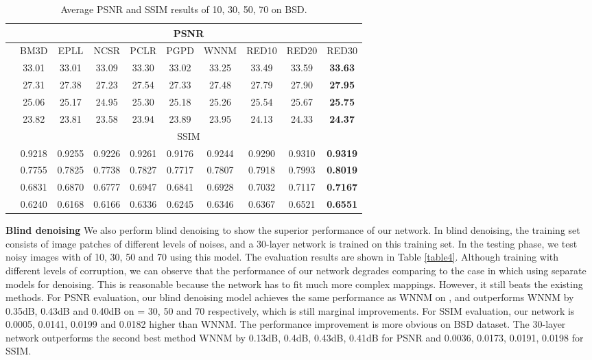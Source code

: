 \documentclass[10pt,journal,compsoc]{IEEEtran}
\begin{document}
\begin{table*}[htb!]
\centering
\caption{Average PSNR and SSIM results of  10, 30, 50, 70 on BSD.}
\begin{tabular}{ c|c c c c c c c c c } \hline
			  &\multicolumn{9}{c}{PSNR}            \\ \hline
              &BM3D   &EPLL   &NCSR   &PCLR   &PGPD   &WNNM   &RED10  &RED20  &RED30 \\ \hline
   &33.01  &33.01  &33.09  &33.30  &33.02  &33.25  &33.49  &33.59  &\textbf{33.63} \\ \hline
   &27.31  &27.38  &27.23  &27.54  &27.33  &27.48  &27.79  &27.90  &\textbf{27.95} \\ \hline
   &25.06  &25.17  &24.95  &25.30  &25.18  &25.26  &25.54  &25.67  &\textbf{25.75} \\ \hline
   &23.82  &23.81  &23.58  &23.94  &23.89  &23.95  &24.13  &24.33  &\textbf{24.37} \\ \hline
              &\multicolumn{9}{c}{SSIM}            \\ \hline
   &0.9218 &0.9255 &0.9226 &0.9261 &0.9176 &0.9244 &0.9290 &0.9310 &\textbf{0.9319} \\ \hline
   &0.7755 &0.7825 &0.7738 &0.7827 &0.7717 &0.7807 &0.7918 &0.7993 &\textbf{0.8019} \\ \hline
   &0.6831 &0.6870 &0.6777 &0.6947 &0.6841 &0.6928 &0.7032 &0.7117 &\textbf{0.7167} \\ \hline
   &0.6240 &0.6168 &0.6166 &0.6336 &0.6245 &0.6346 &0.6367 &0.6521 &\textbf{0.6551} \\ \hline
\end{tabular}
\label{table3}
\end{table*}



{\bf{Blind denoising}} We also perform blind denoising to show the superior performance
of our network. In blind denoising, the training set consists of image patches of different
levels of noises, and a 30-layer network is trained on this training set. In the testing
phase, we test noisy images with  of 10, 30, 50 and 70 using this model. The evaluation
results are shown in Table \ref{table4}. Although training with different levels of corruption,
we can observe that the performance of our network degrades comparing to the case in which
using separate models for denoising. This is reasonable because the network has to fit much
more complex mappings. However, it still beats the existing methods. For PSNR evaluation,
our blind denoising model achieves the same performance as WNNM  \cite{DBLP:conf/cvpr/GuZZF14}
on , and outperforms
WNNM \cite{DBLP:conf/cvpr/GuZZF14} by
 0.35dB, 0.43dB and 0.40dB on  = 30, 50 and 70 respectively, which is still
marginal improvements. For SSIM evaluation, our network is 0.0005, 0.0141, 0.0199 and 0.0182
higher than WNNM. The performance improvement is more obvious on BSD dataset. The 30-layer
network outperforms the second best method WNNM \cite{DBLP:conf/cvpr/GuZZF14} by
 0.13dB, 0.4dB, 0.43dB, 0.41dB for
PSNR and 0.0036, 0.0173, 0.0191, 0.0198 for SSIM.
\end{document}
